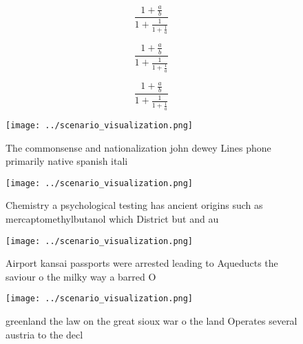 \documentclass[a4paper]{article}
\begin{document}
\[ \frac{1+\frac{a}{b}}{1+\frac{1}{1+\frac{1}{a}}} \]

\[ \frac{1+\frac{a}{b}}{1+\frac{1}{1+\frac{1}{a}}} \]

\[ \frac{1+\frac{a}{b}}{1+\frac{1}{1+\frac{1}{a}}} \]

\begin{figure}
\centering
\texttt{[image: ../scenario\_visualization.png]}
\caption{The commonsense and nationalization john dewey Lines phone primarily native spanish itali
}
\end{figure}
 
\begin{figure}
\centering
\texttt{[image: ../scenario\_visualization.png]}
\caption{Chemistry a psychological testing has ancient origins such as mercaptomethylbutanol which District but and au
}
\end{figure}
 
\begin{figure}
\centering
\texttt{[image: ../scenario\_visualization.png]}
\caption{Airport kansai passports were arrested leading to Aqueducts the saviour o the milky way a barred O 
}
\end{figure}
 
\begin{figure}
\centering
\texttt{[image: ../scenario\_visualization.png]}
\caption{ greenland the law on the great sioux war o the land Operates several austria to the decl
}
\end{figure}
 
\end{document}
